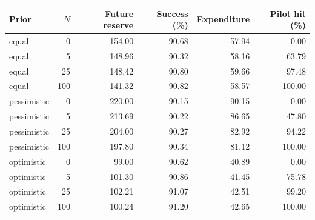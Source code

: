 \begin{tabular}{lrrrrr}
\toprule
Prior & $N$ & Future reserve & Success (\%) & Expenditure & Pilot hit (\%)\\
\midrule
equal & 0 & 154.00 & 90.68 & 57.94 & 0.00\\
equal & 5 & 148.96 & 90.32 & 58.16 & 63.79\\
equal & 25 & 148.42 & 90.80 & 59.66 & 97.48\\
equal & 100 & 141.32 & 90.82 & 58.57 & 100.00\\
pessimistic & 0 & 220.00 & 90.15 & 90.15 & 0.00\\
pessimistic & 5 & 213.69 & 90.22 & 86.65 & 47.80\\
pessimistic & 25 & 204.00 & 90.27 & 82.92 & 94.22\\
pessimistic & 100 & 197.80 & 90.34 & 81.12 & 100.00\\
optimistic & 0 & 99.00 & 90.62 & 40.89 & 0.00\\
optimistic & 5 & 101.30 & 90.86 & 41.45 & 75.78\\
optimistic & 25 & 102.21 & 91.07 & 42.51 & 99.20\\
optimistic & 100 & 100.24 & 91.20 & 42.65 & 100.00\\
\bottomrule
\end{tabular}
